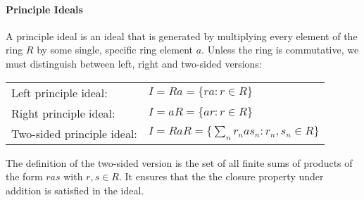 %

\paragraph{Principle Ideals} A principle ideal is an ideal that is generated by multiplying every element of the ring $R$ by some single, specific ring element $a$. Unless the ring is commutative, we must distinguish between left, right and two-sided versions:

\medskip
\begin{tabular}{l l}
Left principle ideal:      & $I = R a = \{ r a : r \in R \}$ \\
Right principle ideal:     & $I = a R = \{ a r : r \in R \}$ \\
Two-sided principle ideal: & $I = RaR = \{ \sum_n r_n a s_n : r_n,s_n \in R \} $ \\
\end{tabular}
\medskip

The definition of the two-sided version is the set of all finite sums of products of the form $r a s$ with $r,s \in R$. It ensures that the the closure property under addition is satisfied in the ideal.%







